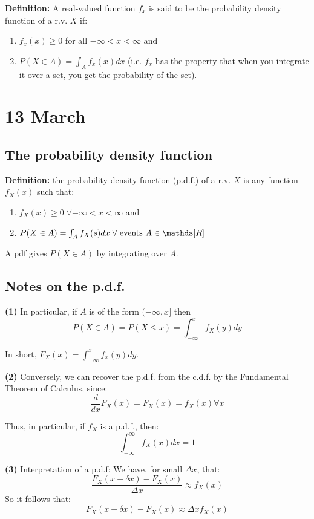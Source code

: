 \documentclass[12pt]{article}
\begin{document}
\textbf{Definition:} A real-valued function $f_x$ is said to be the probability density function of a r.v. $X$ if:
\begin{enumerate}
    \item $f_x (x) \geq 0$ for all $- \infty < x < \infty$ and
    \item $P(X \in A) = \int_A f_x (x) dx$ (i.e. $f_x$ has the property that when you integrate it over a set, you get the probability of the set).
\end{enumerate}

\section{13 March}
\subsection{The probability density function}
\textbf{Definition:} the probability density function (p.d.f.) of a r.v. $X$ is any function $f_X (x)$ such that:
\begin{enumerate}
    \item $f_X (x) \geq 0 \; \forall - \infty < x < \infty$ and
    \item $P(X \in A) = \int_A f_X (s) dx \; \forall \textnormal{ events } A \in \mathds[R]$
\end{enumerate}

A pdf gives $P(X \in A)$ by integrating over $A$.

\subsection{Notes on the p.d.f.}
\textbf{(1)} In particular, if $A$ is of the form $(- \infty, x]$ then %
\[
    P(X \in A) = P(X \leq x) = \int_{-\infty}^{x} f_X (y) dy
\]

In short, $F_X (x) = \int_{-\infty}^{x} f_x (y) dy$.

\textbf{(2)} Conversely, we can recover the p.d.f. from the c.d.f. by the Fundamental Theorem of Calculus, since:
\[
    \frac{d}{dx} F_X (x) = F_X (x) = f_X (x) \forall x
\]

Thus, in particular, if $f_X$ is a p.d.f., then:
\[
    \int_{-\infty}^{\infty} f_X (x) dx = 1
\]

\textbf{(3)} Interpretation of a p.d.f: We have, for small $\Delta x$, that:
\[
    \frac{F_X (x + \delta x) - F_X (x)}{\Delta x} \approx f_X (x)
\]
So it follows that:
\[
    F_X (x+\delta x) - F_X (x) \approx \Delta x f_X (x)
\]
\end{document}

